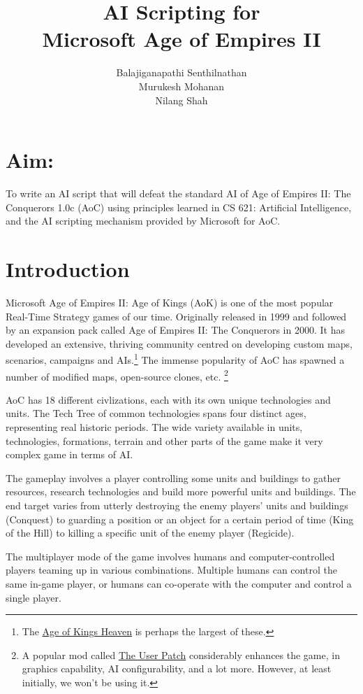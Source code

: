 \documentclass[a4paper,12pt]{article}
\title{AI Scripting for \\Microsoft{\small \texttrademark} Age of Empires II{\small \texttrademark}}
\author{Balajiganapathi Senthilnathan\\Murukesh Mohanan\\Nilang Shah}
\begin{document}
\maketitle

\section*{Aim:}
To write an AI script that will defeat the standard AI of 
Age of Empires II: The Conquerors 1.0c (AoC) using principles learned in 
CS 621: Artificial Intelligence, and the AI scripting mechanism provided 
by Microsoft for AoC.

\section*{Introduction}
Microsoft{\small \texttrademark} Age of Empires II: 
Age of Kings{\small \texttrademark} (AoK) is one of the most popular 
Real-Time Strategy games of our time. Originally released in 1999 and 
followed by an expansion pack called Age of Empires II: 
The Conquerors{\small \texttrademark} in 2000. It has developed an 
extensive, thriving community centred on developing custom maps, 
scenarios, campaigns and AIs.\footnote{The 
\href{http://www.aok.heavengames.com/}{Age of Kings Heaven} is perhaps 
the largest of these.} The immense popularity of 
AoC has spawned a number of modified maps, open-source clones, etc. \footnote{A popular mod called  
\href{http://userpatch.aiscripters.net/}{The User Patch}
considerably enhances the game, in graphics capability, AI  
configurability, and a lot more. However, at least initially, 
we won't be using it.}


AoC has 18 different civlizations, each with its own unique technologies 
and units. The Tech Tree of common technologies spans four distinct ages, 
representing real historic periods.  The wide variety available in units, 
technologies, formations, terrain and other parts of the game make it  
very complex game in terms of AI.

The gameplay involves a player controlling some units and buildings to 
gather resources, research technologies and build more powerful units and 
buildings. The end target varies from utterly destroying the enemy 
players' units and buildings (Conquest) to guarding a position or an 
object for a certain period of time (King of the Hill) to killing a 
specific unit of the enemy player (Regicide). 

The multiplayer mode of the game involves humans and computer-controlled 
players teaming up in various combinations. Multiple humans can control 
the same in-game player, or humans can co-operate with the computer and 
control a single player.
\end{document}

